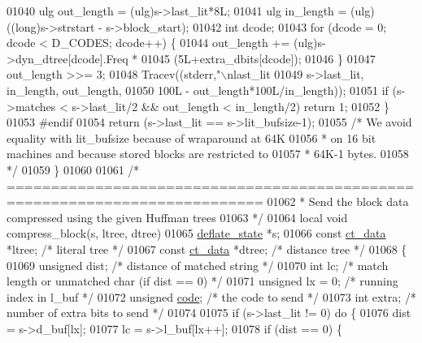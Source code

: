 \begin{DoxyCode}
{{{{{{{{{{{{{{{{{{{{{{01040         ulg out\_length = (ulg)s->last\_lit*8L;
01041         ulg in\_length = (ulg)((long)s->strstart - s->block\_start);
01042         \textcolor{keywordtype}{int} dcode;
01043         \textcolor{keywordflow}{for} (dcode = 0; dcode < D\_CODES; dcode++) \{
01044             out\_length += (ulg)s->dyn\_dtree[dcode].Freq *
01045                 (5L+extra\_dbits[dcode]);
01046         \}
01047         out\_length >>= 3;
01048         Tracev((stderr,\textcolor{stringliteral}{"\(\backslash\)nlast\_lit %
01049                s->last\_lit, in\_length, out\_length,
01050                100L - out\_length*100L/in\_length));
01051         \textcolor{keywordflow}{if} (s->matches < s->last\_lit/2 && out\_length < in\_length/2) \textcolor{keywordflow}{return} 1;
01052     \}
01053 \textcolor{preprocessor}{#endif}
01054     \textcolor{keywordflow}{return} (s->last\_lit == s->lit\_bufsize-1);
01055     \textcolor{comment}{/* We avoid equality with lit\_bufsize because of wraparound at 64K}
01056 \textcolor{comment}{     * on 16 bit machines and because stored blocks are restricted to}
01057 \textcolor{comment}{     * 64K-1 bytes.}
01058 \textcolor{comment}{     */}
01059 \}
01060 
01061 \textcolor{comment}{/* ===========================================================================}
01062 \textcolor{comment}{ * Send the block data compressed using the given Huffman trees}
01063 \textcolor{comment}{ */}
01064 local \textcolor{keywordtype}{void} compress\_block(s, ltree, dtree)
01065     \hyperlink{structinternal__state}{deflate\_state} *s;
01066     \textcolor{keyword}{const} \hyperlink{structct__data__s}{ct\_data} *ltree; \textcolor{comment}{/* literal tree */}
01067     \textcolor{keyword}{const} \hyperlink{structct__data__s}{ct\_data} *dtree; \textcolor{comment}{/* distance tree */}
01068 \{
01069     \textcolor{keywordtype}{unsigned} dist;      \textcolor{comment}{/* distance of matched string */}
01070     \textcolor{keywordtype}{int} lc;             \textcolor{comment}{/* match length or unmatched char (if dist == 0) */}
01071     \textcolor{keywordtype}{unsigned} lx = 0;    \textcolor{comment}{/* running index in l\_buf */}
01072     \textcolor{keywordtype}{unsigned} \hyperlink{structcode}{code};      \textcolor{comment}{/* the code to send */}
01073     \textcolor{keywordtype}{int} extra;          \textcolor{comment}{/* number of extra bits to send */}
01074 
01075     \textcolor{keywordflow}{if} (s->last\_lit != 0) \textcolor{keywordflow}{do} \{
01076         dist = s->d\_buf[lx];
01077         lc = s->l\_buf[lx++];
01078         \textcolor{keywordflow}{if} (dist == 0) \{
}}}}}}}}}}}}}}}}}}}}}}}
\end{DoxyCode}
